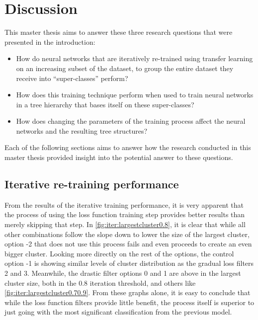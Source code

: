 \chapter{Discussion}


This master thesis aims to answer these three research questions that were presented in the introduction:

\begin{itemize}
    \item How do neural networks that are iteratively re-trained using transfer learning on an increasing subset of the dataset, to group the entire dataset they receive into “super-classes” perform? 
    \item How does this training technique perform when used to train neural networks in a tree hierarchy that bases itself on these super-classes?
    \item How does changing the parameters of the training process affect the neural networks and the resulting tree structures?
\end{itemize}{}

Each of the following sections aims to answer how the research conducted in this master thesis provided insight into the potential answer to these questions.


\section{Iterative re-training performance}
From the results of the iterative training performance, it is very apparent that the process of using the loss function training step provides better results than merely skipping that step.
In \cref{fig:iter:largestcluster0.8}, it is clear that while all other combinations follow the slope down to lower the size of the largest cluster, option -2 that does not use this process fails and even proceeds to create an even bigger cluster.
Looking more directly on the rest of the options, the control option -1 is showing similar levels of cluster distribution as the gradual loss filters 2 and 3.
Meanwhile, the drastic filter options 0 and 1 are above in the largest cluster size, both in the 0.8 iteration threshold, and others like \cref{fig:iter:largestcluster0.70.9}.
From these graphs alone, it is easy to conclude that while the loss function filters provide little benefit, the process itself is superior to just going with the most significant classification from the previous model.

